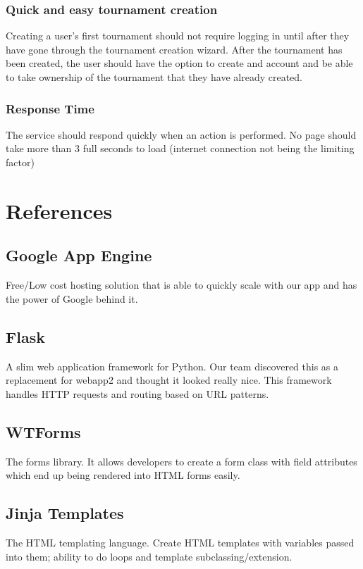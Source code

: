 \documentclass{article}
\begin{document}
\subsubsection{Quick and easy tournament creation}
Creating a user’s first tournament should not require logging in until after they have gone through the tournament creation wizard.  After the tournament has been created, the user should have the option to create and account and be able to take ownership of the tournament that they have already created.  

\subsubsection{Response Time}
The service should respond quickly when an action is performed. No page should take more than 3 full seconds to load (internet connection not being the limiting factor)



\newpage
\section{References}
\subsection{Google App Engine}
Free/Low cost hosting solution that is able to quickly scale with our app and has the power of Google behind it.

\subsection{Flask}
A slim web application framework for Python. Our team discovered this as a replacement for webapp2 and thought it looked really nice. This framework handles HTTP requests and routing based on URL patterns.

\subsection{WTForms}
The forms library. It allows developers to create a form class with field attributes which end up being rendered into HTML forms easily.

\subsection{Jinja Templates}
The HTML templating language. Create HTML templates with variables passed into them; ability to do loops and template subclassing/extension.
\end{document}
